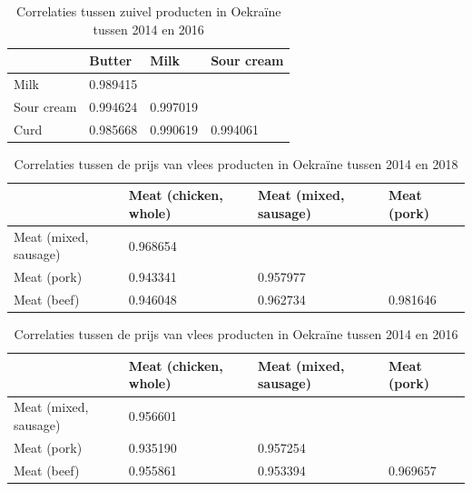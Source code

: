 \documentclass{article}
\begin{document}
 \begin{table}[ht!]
\centering
\caption{Correlaties tussen zuivel producten in Oekraïne tussen 2014 en 2016}
\label{zuivel-2014-2016}
\begin{tabular}{l|lll}
            & Butter   & Milk     & Sour cream \\ \hline
Milk        & 0.989415 &          &            \\
Sour cream  & 0.994624 & 0.997019 &            \\
Curd        & 0.985668 & 0.990619 & 0.994061  
\end{tabular}
\end{table}


\begin{table}[h!]
\centering
\caption{Correlaties tussen de prijs van vlees producten in Oekraïne tussen 2014 en 2018}
\label{vlees-2014-2018}
\begin{tabular}{l|lll}
                      & Meat (chicken, whole) & Meat (mixed, sausage) & Meat (pork) \\ \hline
Meat (mixed, sausage) & 0.968654              &                       &             \\
Meat (pork)           & 0.943341              & 0.957977              &             \\
Meat (beef)           & 0.946048              & 0.962734              & 0.981646   
\end{tabular}
\end{table}

\begin{table}[h!]
\centering
\caption{Correlaties tussen de prijs van vlees producten in Oekraïne tussen 2014 en 2016}
\label{vlees-2014-2016}
\begin{tabular}{l|lll}
                      & Meat (chicken, whole) & Meat (mixed, sausage) & Meat (pork) \\ \hline
Meat (mixed, sausage) & 0.956601              &                       &             \\
Meat (pork)           & 0.935190              & 0.957254              &             \\
Meat (beef)           & 0.955861              & 0.953394              & 0.969657   
\end{tabular}
\end{table}
\end{document}
